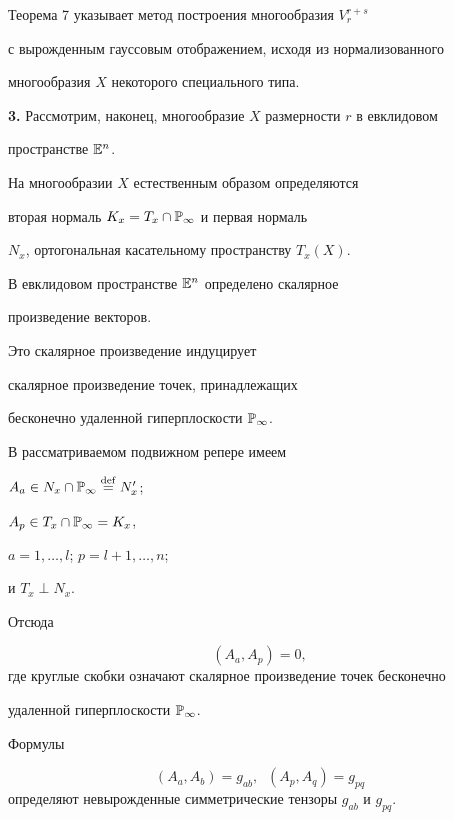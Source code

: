 Теорема 7 указывает метод построения многообразия $V^{r+s}_{r}$


с вырожденным гауссовым отображением, исходя из нормализованного


многообразия $X$ некоторого специального типа.





{\bf 3.} Рассмотрим, наконец, многообразие $X$ размерности $r$ в евклидовом


пространстве $\Bbb{E}^n$.


 На многообразии $X$ естественным образом определяются


вторая нормаль $K_x = T_x \cap \Bbb{P}_\infty$ и первая нормаль


$N_x$, ортогональная касательному пространству $T_x (X)$.



 В евклидовом пространстве $\Bbb{E}^n$ определено скалярное


произведение векторов.


 Это скалярное произведение индуцирует


скалярное произведение точек, принадлежащих


бесконечно удаленной гиперплоскости $\Bbb{P}_\infty$.


В рассматриваемом подвижном репере имеем


$A_a \in N_x \cap \Bbb{P}_\infty \overset{\mathrm{def}}{=}{} N'_x$;


$A_p \in T_x \cap \Bbb{P}_\infty = K_x$,


$a = 1, \dotsc, l$; $p = l + 1, \dotsc, n$;


и $T_x \perp N_x$.


Отсюда


\begin{equation}\label{eq:60}
(A_a, A_p) = 0,
\end{equation}
 где круглые скобки означают скалярное произведение точек бесконечно


удаленной гиперплоскости $\Bbb{P}_\infty$.


 Формулы


\begin{equation}\label{eq:61}


(A_a, A_b) = g_{ab}, \;\; (A_p, A_q) = g_{pq}


\end{equation}
определяют невырожденные симметрические тензоры $g_{ab}$ и $g_{pq}$.






